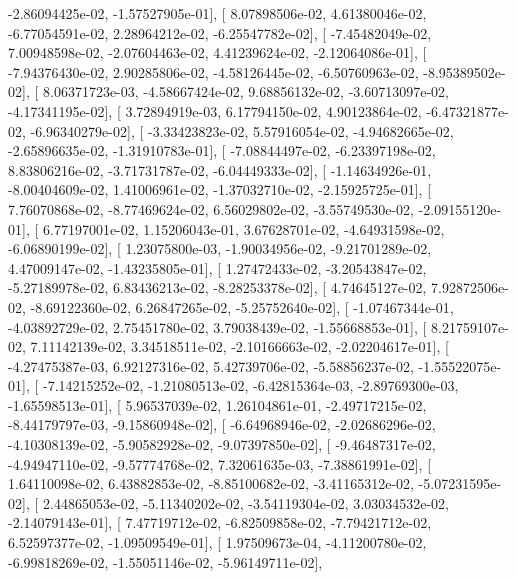 \documentclass{article}
\begin{document}
         -2.86094425e-02,  -1.57527905e-01],
       [  8.07898506e-02,   4.61380046e-02,  -6.77054591e-02,
          2.28964212e-02,  -6.25547782e-02],
       [ -7.45482049e-02,   7.00948598e-02,  -2.07604463e-02,
          4.41239624e-02,  -2.12064086e-01],
       [ -7.94376430e-02,   2.90285806e-02,  -4.58126445e-02,
         -6.50760963e-02,  -8.95389502e-02],
       [  8.06371723e-03,  -4.58667424e-02,   9.68856132e-02,
         -3.60713097e-02,  -4.17341195e-02],
       [  3.72894919e-03,   6.17794150e-02,   4.90123864e-02,
         -6.47321877e-02,  -6.96340279e-02],
       [ -3.33423823e-02,   5.57916054e-02,  -4.94682665e-02,
         -2.65896635e-02,  -1.31910783e-01],
       [ -7.08844497e-02,  -6.23397198e-02,   8.83806216e-02,
         -3.71731787e-02,  -6.04449333e-02],
       [ -1.14634926e-01,  -8.00404609e-02,   1.41006961e-02,
         -1.37032710e-02,  -2.15925725e-01],
       [  7.76070868e-02,  -8.77469624e-02,   6.56029802e-02,
         -3.55749530e-02,  -2.09155120e-01],
       [  6.77197001e-02,   1.15206043e-01,   3.67628701e-02,
         -4.64931598e-02,  -6.06890199e-02],
       [  1.23075800e-03,  -1.90034956e-02,  -9.21701289e-02,
          4.47009147e-02,  -1.43235805e-01],
       [  1.27472433e-02,  -3.20543847e-02,  -5.27189978e-02,
          6.83436213e-02,  -8.28253378e-02],
       [  4.74645127e-02,   7.92872506e-02,  -8.69122360e-02,
          6.26847265e-02,  -5.25752640e-02],
       [ -1.07467344e-01,  -4.03892729e-02,   2.75451780e-02,
          3.79038439e-02,  -1.55668853e-01],
       [  8.21759107e-02,   7.11142139e-02,   3.34518511e-02,
         -2.10166663e-02,  -2.02204617e-01],
       [ -4.27475387e-03,   6.92127316e-02,   5.42739706e-02,
         -5.58856237e-02,  -1.55522075e-01],
       [ -7.14215252e-02,  -1.21080513e-02,  -6.42815364e-03,
         -2.89769300e-03,  -1.65598513e-01],
       [  5.96537039e-02,   1.26104861e-01,  -2.49717215e-02,
         -8.44179797e-03,  -9.15860948e-02],
       [ -6.64968946e-02,  -2.02686296e-02,  -4.10308139e-02,
         -5.90582928e-02,  -9.07397850e-02],
       [ -9.46487317e-02,  -4.94947110e-02,  -9.57774768e-02,
          7.32061635e-03,  -7.38861991e-02],
       [  1.64110098e-02,   6.43882853e-02,  -8.85100682e-02,
         -3.41165312e-02,  -5.07231595e-02],
       [  2.44865053e-02,  -5.11340202e-02,  -3.54119304e-02,
          3.03034532e-02,  -2.14079143e-01],
       [  7.47719712e-02,  -6.82509858e-02,  -7.79421712e-02,
          6.52597377e-02,  -1.09509549e-01],
       [  1.97509673e-04,  -4.11200780e-02,  -6.99818269e-02,
         -1.55051146e-02,  -5.96149711e-02],
\end{document}

